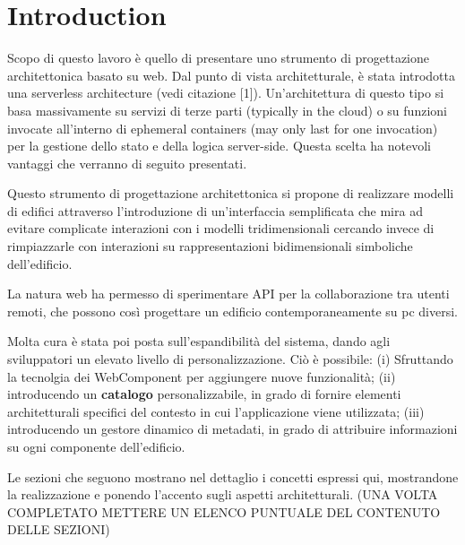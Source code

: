\section{Introduction}

Scopo di questo lavoro \`e quello di presentare uno strumento di progettazione architettonica basato su web. Dal punto di vista architetturale, è stata introdotta una serverless architecture (vedi citazione [1]). Un'architettura di questo tipo si basa massivamente su servizi di terze parti (typically in the cloud) o su funzioni invocate all'interno di ephemeral containers (may only last for one invocation) per la gestione dello stato e della logica server-side. Questa scelta ha notevoli vantaggi che verranno di seguito presentati.

Questo strumento di progettazione architettonica si propone di realizzare modelli di edifici attraverso l'introduzione di un'interfaccia semplificata che mira ad evitare complicate interazioni con i modelli tridimensionali cercando invece di rimpiazzarle con interazioni su rappresentazioni bidimensionali simboliche dell'edificio.

La natura web ha permesso di sperimentare API per la collaborazione tra utenti remoti, che possono cos\`i progettare un edificio contemporaneamente su pc diversi.

Molta cura \`e stata poi posta sull'espandibilit\`a del sistema, dando agli sviluppatori un elevato livello di personalizzazione. Ciò è possibile: (i) Sfruttando la tecnolgia dei WebComponent per aggiungere nuove funzionalità; (ii) introducendo un \textbf{catalogo} personalizzabile, in grado di fornire elementi architetturali specifici del contesto in cui l'applicazione viene utilizzata; (iii) introducendo un gestore dinamico di metadati, in grado di attribuire informazioni su ogni componente dell'edificio.


Le sezioni che seguono mostrano nel dettaglio i concetti espressi qui, mostrandone la realizzazione e ponendo l'accento sugli aspetti architetturali. (UNA VOLTA COMPLETATO METTERE UN ELENCO PUNTUALE DEL CONTENUTO DELLE SEZIONI)
